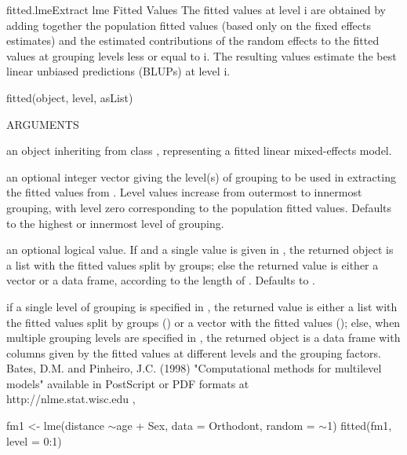 \documentclass[pdftex]{article} \usepackage{url,graphicx}
\renewcommand{\Twiddle}{\mbox{\(\sim\)}}
\begin{document}
\begin{Helpfile}{fitted.lme}{Extract lme Fitted Values}
The fitted values at level i are obtained by adding together the
population fitted values (based only on the fixed effects estimates)
and the estimated contributions of the random effects to the fitted
values at grouping levels less or equal to i. The resulting
values estimate the best linear unbiased predictions (BLUPs) at level
i.
\begin{Example}
fitted(object, level, asList)
\end{Example}
\begin{Argument}{ARGUMENTS}
\item[\Co{object:}]
an object inheriting from class , representing
a fitted linear mixed-effects model.
\item[\Co{level:}]
an optional integer vector giving the level(s) of grouping
to be used in extracting the fitted values from . Level
values increase from outermost to innermost grouping, with
level zero corresponding to the population fitted values. Defaults to
the highest or innermost level of grouping.
\item[\Co{asList:}]
an optional logical value. If  and a single
value is given in , the returned object is a list with
the fitted values split by groups; else the returned value is
either a vector or a data frame, according to the length of
. Defaults to .
\end{Argument}
if a single level of grouping is specified in , the
returned value is either a list with the fitted values split by groups
() or a vector with the fitted values
(); else, when multiple grouping levels are
specified in , the returned object is a data frame with
columns given by the fitted values at different levels and the
grouping factors.
Bates, D.M. and Pinheiro, J.C. (1998) "Computational methods for
multilevel models" available in PostScript or PDF formats at \\
http://nlme.stat.wisc.edu
, 
\need 15pt
\vspace{-16pt} 
\begin{Example}
fm1 <- lme(distance \Twiddle age + Sex, data = Orthodont, random = \Twiddle 1)
fitted(fm1, level = 0:1)
\end{Example}
\end{Helpfile}
\end{document}

